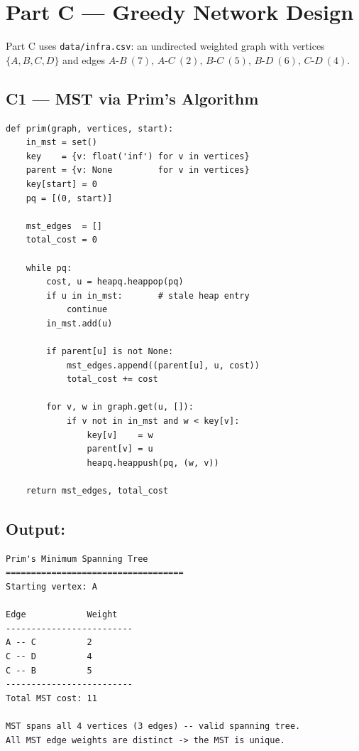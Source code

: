 \documentclass[11pt,a4paper]{article}
\begin{document}
\section{Part C --- Greedy Network Design}

Part C uses \texttt{data/infra.csv}: an undirected weighted graph with vertices $\{A,B,C,D\}$ and edges $A\text{-}B\ (7)$, $A\text{-}C\ (2)$, $B\text{-}C\ (5)$, $B\text{-}D\ (6)$, $C\text{-}D\ (4)$.

\subsection{C1 --- MST via Prim's Algorithm}

\begin{lstlisting}[style=python, caption={Prim's MST (src/c1\_prim.py).}]
def prim(graph, vertices, start):
    in_mst = set()
    key    = {v: float('inf') for v in vertices}
    parent = {v: None         for v in vertices}
    key[start] = 0
    pq = [(0, start)]

    mst_edges  = []
    total_cost = 0

    while pq:
        cost, u = heapq.heappop(pq)
        if u in in_mst:       # stale heap entry
            continue
        in_mst.add(u)

        if parent[u] is not None:
            mst_edges.append((parent[u], u, cost))
            total_cost += cost

        for v, w in graph.get(u, []):
            if v not in in_mst and w < key[v]:
                key[v]    = w
                parent[v] = u
                heapq.heappush(pq, (w, v))

    return mst_edges, total_cost
\end{lstlisting}

\subsection{Output:}
\begin{lstlisting}[style=output]
Prim's Minimum Spanning Tree
===================================
Starting vertex: A

Edge            Weight
-------------------------
A -- C          2
C -- D          4
C -- B          5
-------------------------
Total MST cost: 11

MST spans all 4 vertices (3 edges) -- valid spanning tree.
All MST edge weights are distinct -> the MST is unique.
\end{lstlisting}
\end{document}
